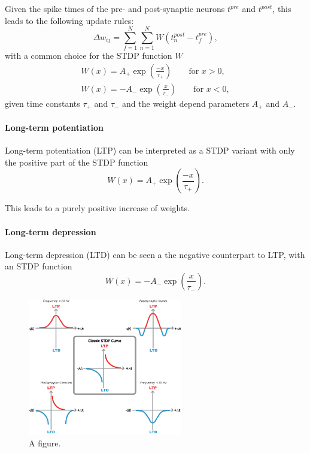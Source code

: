 Given the spike times of the pre- and post-synaptic neurons $t^{pre}$ and $t^{post}$, this leads to the following update rules:
\[
\Delta w_{ij} = \sum_{f=1}^N \sum_{n=1}^N W(t^{post}_n - t^{pre}_f),
\]
with a common choice for the STDP function $W$
\[
\begin{split}
W(x) =  A_+ \exp(\frac{-x}{\tau_+}) \quad \quad \text{for  } x > 0,  \\
W(x) = -A_- \exp(\frac{x}{\tau_-}) \quad \quad \text{for  } x < 0,
\end{split}
\]
given time constants $\tau_+$ and $\tau_-$ and the weight depend parameters $A_+$ and $A_-$.
     

\paragraph{Long-term potentiation}
 
Long-term potentiation (LTP) can be interpreted as a STDP variant with only the positive part of the STDP function
\[
W(x) =  A_+ \exp(\frac{-x}{\tau_+}).
\]

This leads to a purely positive increase of weights.

\paragraph{Long-term depression}

Long-term depression (LTD) can be seen a the negative counterpart to LTP, with an STDP function
\[
W(x) =  -A_- \exp(\frac{x}{\tau_-}).
\]

\begin{figure}
	\centering
    	\includegraphics[width=0.6\textwidth]{imgs/stdp_curves.jpg} 
    \caption{A figure.}
	\label{fig:test}
\end{figure}